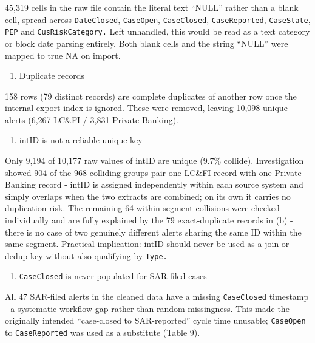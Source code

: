 \documentclass[
]{article}
\providecommand{\tightlist}{%
  \setlength{\itemsep}{0pt}\setlength{\parskip}{0pt}}
\begin{document}
45,319 cells in the raw file contain the literal text ``NULL'' rather
than a blank cell, spread across \texttt{DateClosed}, \texttt{CaseOpen},
\texttt{CaseClosed}, \texttt{CaseReported}, \texttt{CaseState},
\texttt{PEP} and \texttt{CusRiskCategory.} Left unhandled, this would be
read as a text category or block date parsing entirely. Both blank cells
and the string ``NULL'' were mapped to true NA on import.

\begin{enumerate}
\def\labelenumi{(\alph{enumi})}
\setcounter{enumi}{1}
\tightlist
\item
  Duplicate records
\end{enumerate}

158 rows (79 distinct records) are complete duplicates of another row
once the internal export index is ignored. These were removed, leaving
10,098 unique alerts (6,267 LC\&FI / 3,831 Private Banking).

\begin{enumerate}
\def\labelenumi{(\alph{enumi})}
\setcounter{enumi}{2}
\tightlist
\item
  intID is not a reliable unique key
\end{enumerate}

Only 9,194 of 10,177 raw values of intID are unique (9.7\% collide).
Investigation showed 904 of the 968 colliding groups pair one LC\&FI
record with one Private Banking record - intID is assigned independently
within each source system and simply overlaps when the two extracts are
combined; on its own it carries no duplication risk. The remaining 64
within-segment collisions were checked individually and are fully
explained by the 79 exact-duplicate records in (b) - there is no case of
two genuinely different alerts sharing the same ID within the same
segment. Practical implication: intID should never be used as a join or
dedup key without also qualifying by \texttt{Type.}

\begin{enumerate}
\def\labelenumi{(\alph{enumi})}
\setcounter{enumi}{3}
\tightlist
\item
  \texttt{CaseClosed} is never populated for SAR-filed cases
\end{enumerate}

All 47 SAR-filed alerts in the cleaned data have a missing
\texttt{CaseClosed} timestamp - a systematic workflow gap rather than
random missingness. This made the originally intended ``case-closed to
SAR-reported'' cycle time unusable; \texttt{CaseOpen} to
\texttt{CaseReported} was used as a substitute (Table 9).
\end{document}
